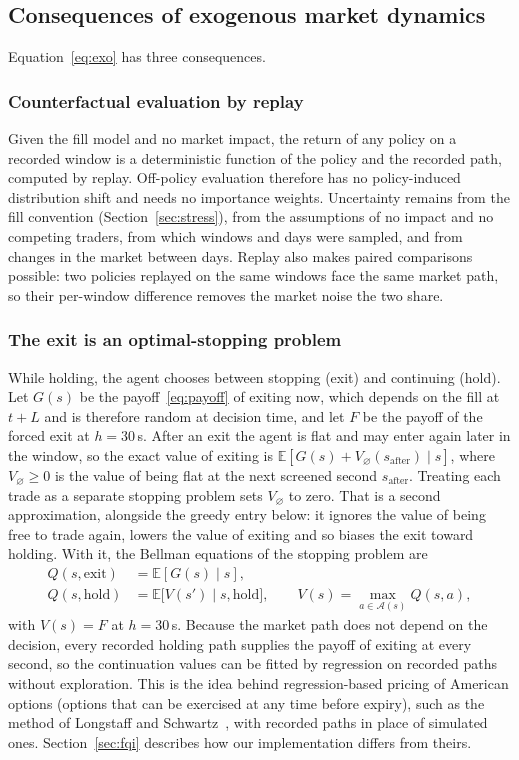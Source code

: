 \documentclass[12pt,a4paper]{article}
\newcommand{\E}{\mathbb{E}}
\begin{document}
\subsection{Consequences of exogenous market dynamics}\label{sec:exo}
Equation~\eqref{eq:exo} has three consequences.

\subsubsection{Counterfactual evaluation by replay}
Given the fill model and no market impact, the return of any policy on a recorded window is a
deterministic function of the policy and the recorded path, computed by replay. Off-policy
evaluation therefore has no policy-induced distribution shift and needs no importance
weights. Uncertainty remains from the fill convention (Section~\ref{sec:stress}), from the
assumptions of no impact and no competing traders, from which windows and days were sampled,
and from changes in the market between days. Replay also makes paired comparisons possible:
two policies replayed on the same windows face the same market path, so their per-window
difference removes the market noise the two share.

\subsubsection{The exit is an optimal-stopping problem}
While holding, the agent chooses between stopping (exit) and continuing (hold). Let $G(s)$ be
the payoff~\eqref{eq:payoff} of exiting now, which depends on the fill at $t+L$ and is
therefore random at decision time, and let $F$ be the payoff of the forced exit at $h=30$\,s.
After an exit the agent is flat and may enter again later in the window, so the exact value of
exiting is $\E[G(s)+V_\varnothing(s_{\text{after}})\mid s]$, where $V_\varnothing\geq0$ is the
value of being flat at the next screened second $s_{\text{after}}$. Treating each trade as a
separate stopping problem sets $V_\varnothing$ to zero. That is a second approximation,
alongside the greedy entry below: it ignores the value of being free to trade again, lowers
the value of exiting and so biases the exit toward holding. With it, the Bellman equations
of the stopping problem are
\begin{align}
Q(s,\text{exit})&=\E[G(s)\mid s], \label{eq:qexit}\\
Q(s,\text{hold})&=\E\bigl[V(s')\mid s,\text{hold}\bigr],\qquad
V(s)=\max_{a\in\mathcal{A}(s)}Q(s,a), \label{eq:qhold}
\end{align}
with $V(s)=F$ at $h=30$\,s. Because the market path does not depend on the decision,
every recorded holding path supplies the payoff of exiting at every second, so the
continuation values can be fitted by regression on recorded paths without exploration. This
is the idea behind regression-based pricing of American options (options that can be
exercised at any time before expiry), such as the method of Longstaff and
Schwartz~\cite{lsm}, with recorded paths in place of simulated ones. Section~\ref{sec:fqi}
describes how our implementation differs from theirs.
\end{document}
